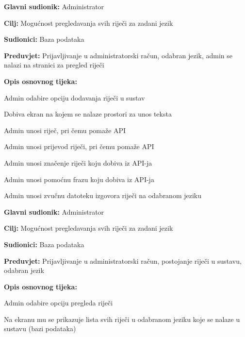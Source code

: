 \noindent {}
\begin{packed_item}

	\item \textbf{Glavni sudionik: } Administrator
	\item \textbf{Cilj: } Mogućnost pregledavanja svih riječi za zadani jezik
	\item \textbf{Sudionici: } Baza podataka
	\item \textbf{Preduvjet: } Prijavljivanje u administratorski račun, odabran jezik, admin se nalazi na stranici za pregled riječi	
	\item  \textbf{Opis osnovnog tijeka:}
	
	\item[] \begin{packed_enum}
		
		\item Admin odabire opciju dodavanja riječi u sustav
		\item Dobiva ekran na kojem se nalaze prostori za unos teksta
		\item Admin unosi riječ, pri čemu pomaže API
		\item Admin unosi prijevod riječi, pri čemu pomaže API
		\item Admin unosi značenje riječi koju dobiva iz API-ja
		\item Admin unosi pomoćnu frazu koju dobiva iz API-ja
		\item Admin unosi zvučnu datoteku izgovora riječi na odabranom jeziku

	\end{packed_enum}
	
\end{packed_item}

\noindent {}
\begin{packed_item}

	\item \textbf{Glavni sudionik: } Administrator
	\item \textbf{Cilj: } Mogućnost pregledavanja svih riječi za zadani jezik
	\item \textbf{Sudionici: } Baza podataka
	\item \textbf{Preduvjet: } Prijavljivanje u administratorski račun, postojanje riječi u sustavu, odabran jezik
	\item  \textbf{Opis osnovnog tijeka:}
	
	\item[] \begin{packed_enum}
		
		\item Admin odabire opciju pregleda riječi
		\item Na ekranu mu se prikazuje lista svih riječi u odabranom jeziku koje se nalaze u sustavu (bazi podataka)

	\end{packed_enum}
	
\end{packed_item}


